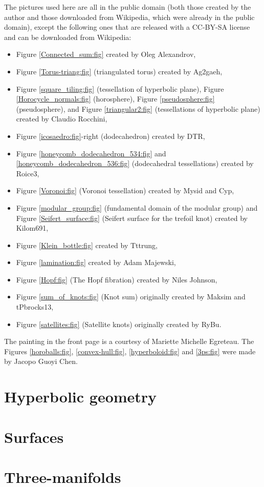 \documentclass [11pt]{amsbook}
\theoremstyle{definition}
\theoremstyle{remark}
\numberwithin{section}{chapter}  %
\numberwithin{subsection}{section}  %
\numberwithin{figure}{chapter}
\numberwithin{table}{chapter}
\begin{document}
The pictures used here are all in the public domain (both those created by the author and those downloaded from Wikipedia, which were already in the public domain), except the following ones that are released with a CC-BY-SA license and can be downloaded from Wikipedia: 
\begin{itemize}
\item Figure \ref{Connected_sum:fig} created by Oleg Alexandrov,
\item Figure \ref{Torus-triang:fig} (triangulated torus) created by Ag2gaeh,
\item Figure \ref{square_tiling:fig} (tessellation of hyperbolic plane), Figure \ref{Horocycle_normals:fig} (horosphere), Figure \ref{pseudosphere:fig} (pseudosphere), and Figure \ref{triangular2:fig} (tessellations of hyperbolic plane) created by Claudio Rocchini,
\item Figure \ref{icosaedro:fig}-right (dodecahedron) created by DTR,
\item Figure \ref{honeycomb_dodecahedron_534:fig} and \ref{honeycomb_dodecahedron_536:fig} (dodecahedral tessellations) created by Roice3,
\item Figure \ref{Voronoi:fig} (Voronoi tessellation) created by Mysid and Cyp,
\item Figure \ref{modular_group:fig} (fundamental domain of the modular group) and Figure \ref{Seifert_surface:fig} (Seifert surface for the trefoil knot) created by Kilom691,
\item Figure \ref{Klein_bottle:fig} created by Tttrung,
\item Figure \ref{lamination:fig} created by Adam Majewski,
\item Figure \ref{Hopf:fig} (The Hopf fibration) created by Niles Johnson,
\item Figure \ref{sum_of_knots:fig} (Knot sum) originally created by Maksim and tPbrocks13,
\item Figure \ref{satellites:fig} (Satellite knots) originally created by RyBu.
\end{itemize}
The painting in the front page is a courtesy of Mariette Michelle Egreteau. The Figures
\ref{horoballs:fig}, \ref{convex-hull:fig}, \ref{hyperboloid:fig} and \ref{3ps:fig} were made by Jacopo Guoyi Chen.

\part{Hyperbolic geometry}






\part{Surfaces}




\part{Three-manifolds}










\printindex
\end{document}
